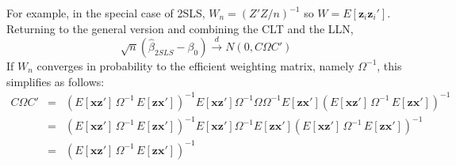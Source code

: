 \documentclass[12pt]{article}
\theoremstyle{definition}
\begin{document}
For example, in the special case of 2SLS, $W_n = (Z'Z/n)^{-1}$ so $W = E[\mathbf{z}_i\mathbf{z}_i']$. Returning to the general version and combining the CLT and the LLN, 
  $$\sqrt{n}\left(\widehat{\beta}_{2SLS} - \beta_0\right) \overset{d}{\rightarrow} N(0, C\Omega C')$$
If $W_n$ converges in probability to the efficient weighting matrix, namely $\Omega^{-1}$, this simplifies as follows:
  \begin{eqnarray*}
    C\Omega C' &=&  \left( E[\mathbf{x}\mathbf{z}']\, \Omega^{-1} \,E[\mathbf{z}\mathbf{x}'] \right)^{-1} E[\mathbf{x}\mathbf{z'}] \Omega^{-1}\Omega \Omega^{-1}E[\mathbf{z}\mathbf{x}']\left( E[\mathbf{x}\mathbf{z}']\, \Omega^{-1} \,E[\mathbf{z}\mathbf{x}'] \right)^{-1}\\
      &=& \left( E[\mathbf{x}\mathbf{z}']\, \Omega^{-1} \,E[\mathbf{z}\mathbf{x}'] \right)^{-1} E[\mathbf{x}\mathbf{z'}]\Omega^{-1}
      E[\mathbf{z}\mathbf{x}']\left( E[\mathbf{x}\mathbf{z}']\, \Omega^{-1} \,E[\mathbf{z}\mathbf{x}'] \right)^{-1}\\
      &=& \left( E[\mathbf{x}\mathbf{z}']\, \Omega^{-1} \,E[\mathbf{z}\mathbf{x}'] \right)^{-1}
  \end{eqnarray*}
\end{document}
